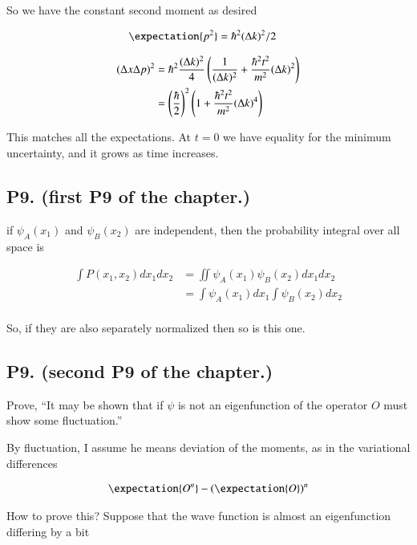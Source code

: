 So we have the constant second moment as desired

\begin{align*}
\expectation{p^2} &= \hbar^2 (\Delta k)^2/2
\end{align*}

\begin{align*}
(\Delta x \Delta p)^2
&= \hbar^2 \frac{(\Delta k)^2}{4} \left( \frac{1}{(\Delta k)^2} + \frac{\hbar^2 t^2}{m^2}(\Delta k)^2 \right) \\
&= \left(\frac{\hbar}{2}\right)^2 \left( 1 + \frac{\hbar^2 t^2}{m^2}(\Delta k)^4 \right) \\
\end{align*}

This matches all the expectations.  At $t=0$ we have equality for the minimum uncertainty, and it grows as
time increases.

\subsection{P9. (first P9 of the chapter.) }

if $\psi_A(x_1)$ and $\psi_B(x_2)$ are independent, then the probability integral over all space is

\begin{align*}
\int P(x_1, x_2) dx_1 dx_2
&=
\iint \psi_A(x_1) \psi_B(x_2) dx_1 dx_2 \\
&=
\int \psi_A(x_1) dx_1 \int \psi_B(x_2) dx_2 \\
\end{align*}

So, if they are also separately normalized then so is this one.

\subsection{P9. (second P9 of the chapter.) }

Prove, ``It may be shown that if $\psi$ is not an eigenfunction of the operator $O$ must show some fluctuation.''

By fluctuation, I assume he means deviation of the moments, 
as in the variational differences

\begin{align*}
\expectation{O^n} - (\expectation{O})^n 
\end{align*}

How to prove this?  Suppose that the wave function is almost an eigenfunction
differing by a bit

